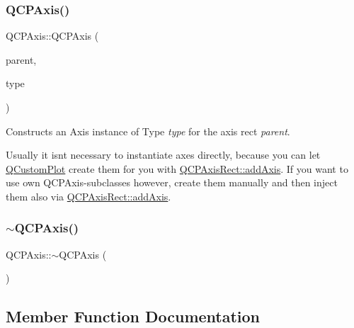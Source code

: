 \subsubsection{\texorpdfstring{Q\+C\+P\+Axis()}{QCPAxis()}}
{\footnotesize\ttfamily Q\+C\+P\+Axis\+::\+Q\+C\+P\+Axis (\begin{DoxyParamCaption}\item[{\hyperlink{class_q_c_p_axis_rect}{Q\+C\+P\+Axis\+Rect} $\ast$}]{parent,  }\item[{\hyperlink{class_q_c_p_axis_ae2bcc1728b382f10f064612b368bc18a}{Axis\+Type}}]{type }\end{DoxyParamCaption})\hspace{0.3cm}{\ttfamily [explicit]}}

Constructs an Axis instance of Type {\itshape type} for the axis rect {\itshape parent}.

Usually it isn\textquotesingle{}t necessary to instantiate axes directly, because you can let \hyperlink{class_q_custom_plot}{Q\+Custom\+Plot} create them for you with \hyperlink{class_q_c_p_axis_rect_a2dc336092ccc57d44a46194c8a23e4f4}{Q\+C\+P\+Axis\+Rect\+::add\+Axis}. If you want to use own Q\+C\+P\+Axis-\/subclasses however, create them manually and then inject them also via \hyperlink{class_q_c_p_axis_rect_a2dc336092ccc57d44a46194c8a23e4f4}{Q\+C\+P\+Axis\+Rect\+::add\+Axis}. \mbox{\label{class_q_c_p_axis_a7cfa27ea9da0bb1fe0ae995572c0b85d}} 
\subsubsection{\texorpdfstring{$\sim$\+Q\+C\+P\+Axis()}{~QCPAxis()}}
{\footnotesize\ttfamily Q\+C\+P\+Axis\+::$\sim$\+Q\+C\+P\+Axis (\begin{DoxyParamCaption}{ }\end{DoxyParamCaption})\hspace{0.3cm}{\ttfamily [virtual]}}



\subsection{Member Function Documentation}
\mbox{\label{class_q_c_p_axis_adbaeffcdc2707f2bd5dc1bbd11236770}} 

